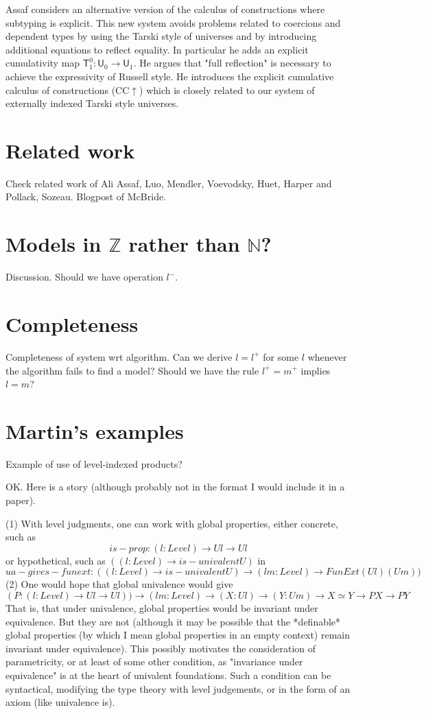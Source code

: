 \documentclass[11pt,a4paper]{article}
\def\UU{\mathsf{U}}
\newcommand{\T}{\mathsf{T}}
\begin{document}
Assaf \cite{Assaf14} considers an alternative version of the calculus of
constructions where subtyping is explicit. This new system avoids problems related to coercions and dependent types by using the Tarski style
of universes and by introducing additional equations to reflect equality. In particular he adds an explicit cumulativity map $\T^0_1 : \UU_0 \to \UU_1$. He argues that "full reflection" is necessary to achieve the expressivity of Russell style. He introduces the explicit cumulative calculus of constructions (CC$\uparrow$) which is closely related to our system of externally indexed Tarski style universes.

\appendix
\section{Related work}

Check related work of Ali Assaf, Luo, Mendler, Voevodsky, Huet, Harper and Pollack, Sozeau. Blogpost of McBride.

\section{Models in $\mathbb{Z}$ rather than $\mathbb{N}$?}

Discussion. Should we have operation $l^-$.

\section{Completeness}

Completeness of system wrt algorithm. Can we derive $l = l^+$ for some $l$ whenever the algorithm fails to find a model? Should we have the rule $l^+ = m^+$ implies $l = m$?

\section{Martin's examples}
Example of use of level-indexed products?

OK. Here is a story (although probably not in the format I would include 
it in a paper).

(1) With level judgments, one can work with global properties, either 
concrete, such as
$$
     is-prop : (l : Level) → U l → U l
$$
or hypothetical, such as $((l : Level) → is-univalent U)$ in
$$
     ua-gives-funext : ((l : Level) → is-univalent U)
                     → (l m : Level) → FunExt (U l) (U m))
$$
(2) One would hope that global univalence would give
$$
       (P : (l : Level) → U l → U l))
     → (l m : Level)
     → (X : U l)
     → (Y : U m)
     → X ≃ Y
     → P X
     → P Y
$$
That is, that under univalence, global properties would be invariant
under equivalence. But they are not (although it may be possible that
the *definable* global properties (by which I mean global properties
in an empty context) remain invariant under equivalence). This
possibly motivates the consideration of parametricity, or at least of
some other condition, as "invariance under equivalence" is at the
heart of univalent foundations. Such a condition can be syntactical,
modifying the type theory with level judgements, or in the form of an
axiom (like univalence is).
\end{document}
